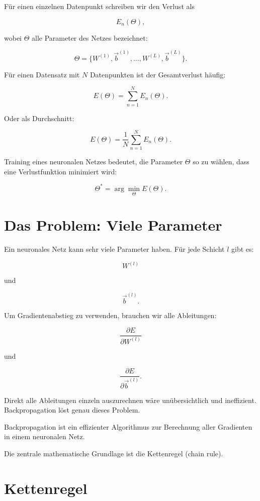 Für einen einzelnen Datenpunkt schreiben wir den Verlust als

\[
    E_n(\Theta),
\]

wobei \(\Theta\) alle Parameter des Netzes bezeichnet:

\[
    \Theta
    =
    \{W^{(1)},\vec{b}^{(1)},\dots,W^{(L)},\vec{b}^{(L)}\}.
\]

Für einen Datensatz mit \(N\) Datenpunkten ist der Gesamtverlust häufig:

\[
    E(\Theta)
    =
    \sum_{n=1}^{N}
    E_n(\Theta).
\]

Oder als Durchschnitt:

\[
    E(\Theta)
    =
    \frac{1}{N}
    \sum_{n=1}^{N}
    E_n(\Theta).
\]

\begin{definitionbox}
Training eines neuronalen Netzes bedeutet, die Parameter \(\Theta\) so zu wählen, dass eine Verlustfunktion minimiert wird:

\[
    \Theta^*
    =
    \arg\min_{\Theta}
    E(\Theta).
\]
\end{definitionbox}

\section{Das Problem: Viele Parameter}

Ein neuronales Netz kann sehr viele Parameter haben.
Für jede Schicht \(l\) gibt es:

\[
    W^{(l)}
\]

und

\[
    \vec{b}^{(l)}.
\]

Um Gradientenabstieg zu verwenden, brauchen wir alle Ableitungen:

\[
    \frac{\partial E}{\partial W^{(l)}}
\]

und

\[
    \frac{\partial E}{\partial \vec{b}^{(l)}}.
\]

Direkt alle Ableitungen einzeln auszurechnen wäre unübersichtlich und ineffizient.
Backpropagation löst genau dieses Problem.

\begin{conceptbox}
Backpropagation ist ein effizienter Algorithmus zur Berechnung aller Gradienten in einem neuronalen Netz.

Die zentrale mathematische Grundlage ist die Kettenregel (chain rule).
\end{conceptbox}

\section{Kettenregel}

